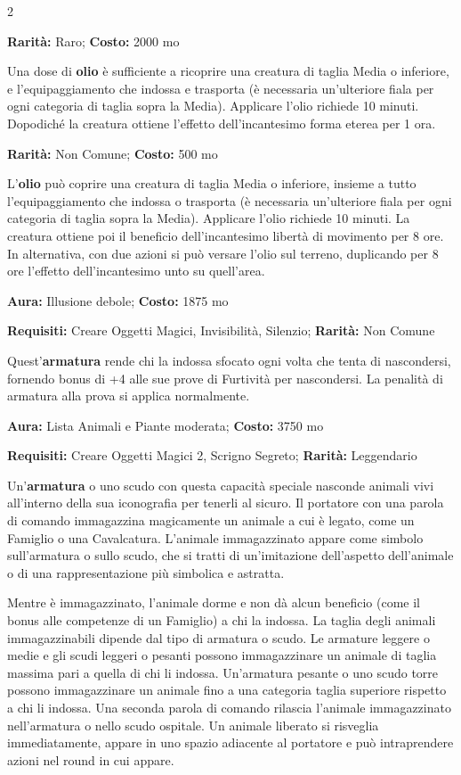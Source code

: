 \begin{multicols}{2}

\textbf{Rarità:} Raro; \textbf{Costo:} 2000 mo

Una dose di \textbf{olio} è sufficiente a ricoprire una creatura di taglia Media o inferiore, e l'equipaggiamento che indossa e trasporta (è necessaria un'ulteriore fiala per ogni categoria di taglia sopra la Media). Applicare l'olio richiede 10 minuti. Dopodiché la creatura ottiene l'effetto dell'incantesimo forma eterea per 1 ora.


\textbf{Rarità:} Non Comune; \textbf{Costo:} 500 mo

L'\textbf{olio} può coprire una creatura di taglia Media o inferiore, insieme a tutto l'equipaggiamento che indossa o trasporta (è necessaria un'ulteriore fiala per ogni categoria di taglia sopra la Media). Applicare l'olio richiede 10 minuti. La creatura ottiene poi il beneficio dell'incantesimo libertà di movimento per 8 ore. In alternativa, con due azioni si può versare l'olio sul terreno, duplicando per 8 ore l'effetto dell'incantesimo unto su quell'area.


\textbf{Aura:} Illusione debole; \textbf{Costo:} 1875 mo

\textbf{Requisiti:} Creare Oggetti Magici, Invisibilità, Silenzio; \textbf{Rarità:} Non Comune

Quest'\textbf{armatura} rende chi la indossa sfocato ogni volta che tenta di nascondersi, fornendo bonus di +4 alle sue prove di Furtività per nascondersi. La penalità di armatura alla prova si applica normalmente.


\textbf{Aura:} Lista Animali e Piante moderata; \textbf{Costo:} 3750 mo

\textbf{Requisiti:} Creare Oggetti Magici 2, Scrigno Segreto; \textbf{Rarità:} Leggendario

Un'\textbf{armatura} o uno scudo con questa capacità speciale nasconde animali vivi all'interno della sua iconografia per tenerli al sicuro. Il portatore con una parola di comando immagazzina magicamente un animale a cui è legato, come un Famiglio o una Cavalcatura. L'animale immagazzinato appare come simbolo sull'armatura o sullo scudo, che si tratti di un'imitazione dell'aspetto dell'animale o di una rappresentazione più simbolica e astratta.

Mentre è immagazzinato, l'animale dorme e non dà alcun beneficio (come il bonus alle competenze di un Famiglio) a chi la indossa. La taglia degli animali immagazzinabili dipende dal tipo di armatura o scudo. Le armature leggere o medie e gli scudi leggeri o pesanti possono immagazzinare un animale di taglia massima pari a quella di chi li indossa. Un'armatura pesante o uno scudo torre possono immagazzinare un animale fino a una categoria taglia superiore rispetto a chi li indossa. Una seconda parola di comando rilascia l'animale immagazzinato nell'armatura o nello scudo ospitale. Un animale liberato si risveglia immediatamente, appare in uno spazio adiacente al portatore e può intraprendere azioni nel round in cui appare.


\end{multicols}
